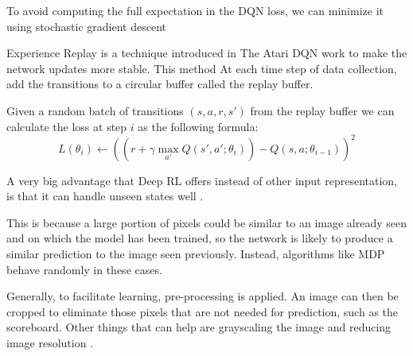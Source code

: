 To avoid computing the full expectation in the DQN loss, we can minimize it using stochastic gradient descent

Experience Replay is a technique introduced in The Atari DQN work to make the network updates more stable.
This method At each time step of data collection, add the transitions to a circular buffer called the replay buffer.

Given a random batch of transitions $(s, a, r, s')$ from the replay buffer we can calculate the loss at step $i$ as the following formula:
\begin{equation*}
    L(\theta_i) \leftarrow ((r + \gamma \max_{a'} Q(s', a'; \theta_i)) - Q(s, a; \theta_{i-1}))^2    
\end{equation*}

A very big advantage that Deep RL offers instead of other input representation,
is that it can handle unseen states well \cite{mnih2013playing} \cite{karpathy2016deep}.

This is because a large portion of pixels could be similar to an image already seen and on which the model has been trained, so the network is likely to produce a similar prediction to the image seen previously. Instead, algorithms like MDP behave randomly in these cases.

Generally, to facilitate learning, pre-processing is applied.
An image can then be cropped to eliminate those pixels that are not needed for prediction, such as the scoreboard. Other things that can help are grayscaling the image and reducing image resolution \cite{mnih2013playing}.
